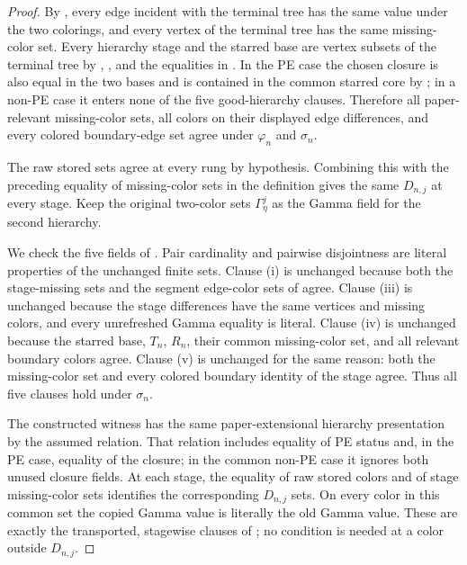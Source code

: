 \begin{proof}
By , every edge incident with the
terminal tree has the same value under the two colorings, and every
vertex of the terminal tree has the same missing-color set.  Every
hierarchy stage and the starred base are vertex subsets of the terminal
tree by , , and the
equalities in .  In the PE case the chosen
closure is also equal in the two bases and is contained in the common
starred core by ; in a non-PE case it enters
none of the five good-hierarchy clauses.  Therefore all paper-relevant
missing-color sets, all colors on their displayed edge differences, and
every colored boundary-edge set agree under $\varphi_n$ and $\sigma_n$.

The raw stored sets agree at every rung by hypothesis.  Combining this
with the preceding equality of missing-color sets in the definition
 gives the same $D_{n,j}$ at every
stage.  Keep the original two-color sets
$\Gamma^j_\eta$ as the Gamma field for the second hierarchy.

We check the five fields of .  Pair cardinality
and pairwise disjointness are literal properties of the unchanged finite
sets.  Clause (i) is unchanged because both the stage-missing sets and
the segment edge-color sets of  agree.
Clause (iii) is unchanged because the stage differences have the same
vertices and missing colors, and every unrefreshed Gamma equality is
literal.  Clause (iv) is unchanged because the starred base,
$T_n$, $R_n$, their common missing-color set, and all relevant boundary
colors agree.  Clause (v) is unchanged for the same reason: both the
missing-color set and every colored boundary identity of the stage agree.
Thus all five clauses hold under $\sigma_n$.

The constructed witness has the same paper-extensional hierarchy
presentation by the assumed  relation.
That relation includes equality of PE status and, in the PE case,
equality of the closure; in the common non-PE case it ignores both unused
closure fields.  At each stage, the equality of raw stored colors and of
stage missing-color sets identifies the corresponding $D_{n,j}$ sets.
On every color in this common set the copied Gamma value is literally the
old Gamma value.  These are exactly the transported, stagewise clauses of
; no condition is needed at a color outside
$D_{n,j}$.
\end{proof}
